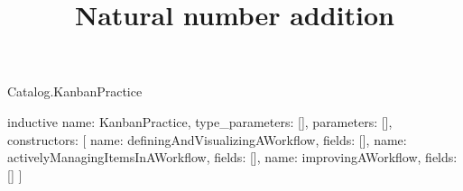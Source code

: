 \begin{lexlean}{Catalog.KanbanPractice}
\title{Natural number addition}
\begin{semanticmodule}
inductive{
  name: KanbanPractice,
  type_parameters: [],
  parameters: [],
  constructors: [
    {name: definingAndVisualizingAWorkflow, fields: []},
    {name: activelyManagingItemsInAWorkflow, fields: []},
    {name: improvingAWorkflow, fields: []}
  ]
}
\end{semanticmodule}
\end{lexlean}
